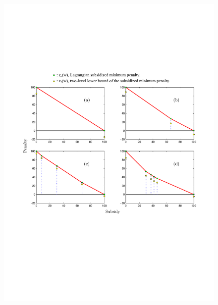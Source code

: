 \documentclass[11pt]{article}
\begin{document}
{\begin{figure}[H]
\centering
\includegraphics[width=1\textwidth]{1.pdf}
\centering
\end{figure}

}
\end{document}
